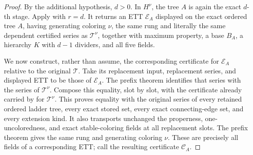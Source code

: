 \begin{proof}
By the additional hypothesis, $d>0$.  In $H^\nu$, the tree $A$ is again the exact
$d$-th stage.  Apply  with
$r=d$.  It returns an ETT $\mathcal E_A$ displayed on the exact ordered
tree $A$, having generating coloring $\nu$, the same rung and literally
the same dependent certified series as $\mathcal T^\nu$, together with
maximum property, a base $B_A$, a hierarchy $K$ with $d-1$ dividers, and
all five  fields.

We now construct, rather than assume, the corresponding certificate for
$\mathcal E_A$ relative to the original $\mathcal T$.  Take its
replacement input, replacement series, and displayed ETT to be those of
$\mathcal E_A$.  The prefix theorem identifies that series with the
series of $\mathcal T^\nu$.  Compose this equality, slot by slot, with
the certificate already carried by
 for $\mathcal T^\nu$.
This proves equality with the original series of every retained ordered
ladder tree, every exact stored set, every exact connecting-edge set, and
every extension kind.  It also transports unchanged the properness,
one-uncoloredness, and exact stable-coloring fields at all replacement
slots.  The prefix theorem gives the same rung and generating coloring
$\nu$.  These are precisely all fields of a corresponding ETT; call the
resulting certificate $\mathcal C_A$.


\end{proof}
